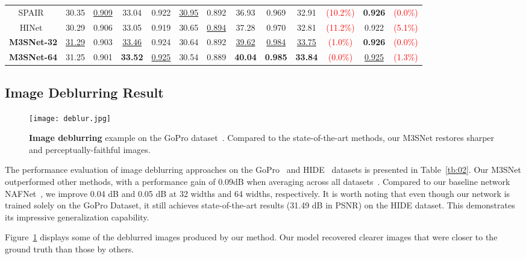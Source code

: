 \documentclass[sn-mathphys,Numbered]{sn-jnl}
\theoremstyle{thmstyleone}\newtheorem{theorem}{Theorem}\newtheorem{proposition}[theorem]{Proposition}
\theoremstyle{thmstyletwo}\newtheorem{example}{Example}\newtheorem{remark}{Remark}
\theoremstyle{thmstylethree}\newtheorem{definition}{Definition}
\begin{document}
\begin{sidewaystable}
\begin{tabular}{ccccccccc||cccc}
     SPAIR~\cite{SPAIR}  & 30.35 & \underline{0.909} & 33.04 &  0.922   & \underline{30.95} & 0.892  & 36.93 & 0.969& 32.91 &\textcolor{red}{(10.2\%)}& \textbf{0.926}&\textcolor{red}{(0.0\%)}
     \\
      HINet~\cite{Chen_2021_CVPR}  & 30.29 & 0.906 & 33.05&  0.919   & 30.65 & \underline{0.894}  & 37.28 & 0.970 & 32.81 &\textcolor{red}{(11.2\%)} & 0.922&\textcolor{red}{(5.1\%)}
     \\
\hline
      \textbf{M3SNet-32}  & \underline{31.29} & 0.903 & \underline{33.46}& 0.924   & 30.64 & 0.892  & \underline{39.62} & \underline{0.984} & \underline{33.75}   &\textcolor{red}{(1.0\%)} & \textbf{0.926}&\textcolor{red}{(0.0\%)}
      \\
      \textbf{M3SNet-64}  & 31.25 & 0.901 & \textbf{33.52} &  \underline{0.925}  & 30.54 & 0.889  & \textbf{40.04} & \textbf{0.985} & \textbf{33.84} &\textcolor{red}{(0.0\%)} & \underline{0.925}&\textcolor{red}{(1.3\%)}
    \\
    \hline
\end{tabular}
\end{sidewaystable}



\subsection{Image Deblurring Result}

\begin{figure} \centerline{\texttt{[image: deblur.jpg]}}
	\caption{\textbf{Image deblurring} example on the GoPro dataset~\cite{Gopro}. Compared to the state-of-the-art methods, our M3SNet
restores sharper and perceptually-faithful images.}
	\label{fig:07}
\end{figure}

The performance evaluation of image deblurring approaches on the GoPro~\cite{Gopro} and HIDE~\cite{HIDE} datasets is presented in Table~\ref{tb:02}. Our M3SNet outperformed other methods, with a performance gain of 0.09dB when averaging across all datasets~\cite{Gopro,HIDE}. Compared to our baseline network NAFNet~\cite{chen2022simple}, we improve 0.04 dB and 0.05 dB at 32 widths and 64 widths, respectively. It is worth noting that even though our network is trained solely on the GoPro Dataset, it still achieves state-of-the-art results (31.49 dB in PSNR) on the HIDE dataset. This demonstrates its impressive generalization capability.

Figure~\ref{fig:07} displays some of the deblurred images produced by our  method. Our model recovered clearer images that were closer to the ground truth than those by others.
\end{document}
